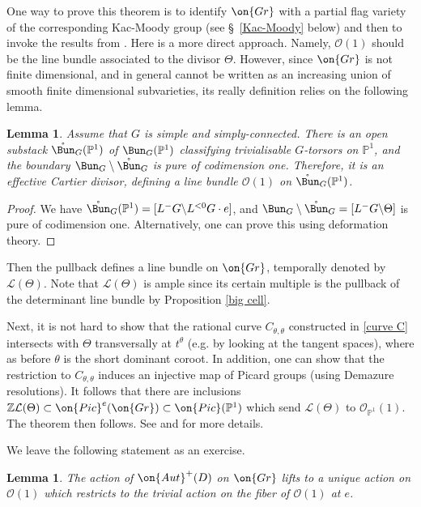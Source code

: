 \documentclass[]{pcmi}
\theoremstyle{plain}
\newtheorem{lem}[equation]{Lemma}
\theoremstyle{remark}
\theoremstyle{definition}
\newcommand{\bP}{{\mathbb P}}
\newcommand{\bZ}{{\mathbb Z}}
\newcommand{\mL}{{\mathcal L}}
\newcommand{\mO}{{\mathcal O}}
\newcommand{\Aut}{{\on{Aut}}}
\newcommand{\Gr}{{\on{Gr}}}
\newcommand{\Pic}{{\on{Pic}}}
\begin{document}
One way to prove this theorem is to identify $\Gr$ with a partial flag variety of the corresponding Kac-Moody group (see \S~\ref{Kac-Moody} below) and then to invoke the results from \cite{Ma}. Here is a more direct approach. Namely, $\mO(1)$ should be the line bundle associated to the divisor $\Theta$. However, since $\Gr$ is not finite dimensional, and in general cannot be written as an increasing union of smooth finite dimensional subvarieties, its really definition relies on the following lemma.
\begin{lem}\label{O1 on Bun}
Assume that $G$ is simple and simply-connected.
There is an open substack $\mathring{\Bun}_G(\bP^1)$ of $\Bun_G(\bP^1)$ classifying trivialisable $G$-torsors on $\bP^1$, and the boundary $\Bun_G\setminus \mathring{\Bun}_G$ is pure of codimension one. Therefore, it is an effective Cartier divisor, defining a line bundle $\mO(1)$ on $\mathring{\Bun}_G(\bP^1)$.
\end{lem}
\begin{proof}We have $\mathring{\Bun}_G(\bP^1)= [L^-G\backslash L^{<0}G\cdot e]$, and $\Bun_G\setminus \mathring{\Bun}_G=[L^-G\backslash \Theta]$ is pure of codimension one. Alternatively, one can prove this using deformation theory. \end{proof}

Then the pullback defines a line bundle on $\Gr$, temporally denoted by $\mL(\Theta)$. Note that $\mL(\Theta)$ is ample since its certain multiple is the pullback of the determinant line bundle  by Proposition \ref{big cell}.
 
Next, it is not hard to show that the rational curve $C_{\theta,\theta}$ constructed in \eqref{curve C} intersects with $\Theta$ transversally at $t^\theta$ (e.g. by looking at the tangent spaces), where as before $\theta$ is the short dominant coroot. In addition, one can show that the restriction to $C_{\theta,\theta}$ induces an injective map of Picard groups (using Demazure resolutions). It follows that there are inclusions $\bZ\mL(\Theta)\subset \Pic^e(\Gr)\subset\Pic(\bP^1)$ which send $\mL(\Theta)$ to $\mO_{\bP^1}(1)$.
 The theorem then follows. See \cite[Corollary 12]{Fa} and \cite[\S~10.2]{So} for more details. 



We leave the following statement as an exercise.
\begin{lem}\label{lifting Aut action}
The action of $\Aut^+(D)$ on $\Gr$ lifts to a unique action on $\mO(1)$ which restricts to the trivial action on the fiber of $\mO(1)$ at $e$.
\end{lem}
\end{document}
